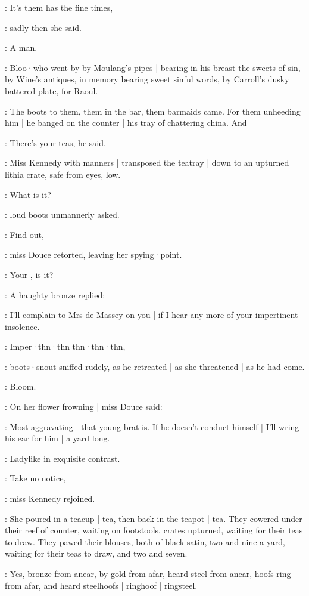 \MissK:
It's them has the fine times,

:
sadly then she said.

:
A man.

:
Bloo·who went by by Moulang's pipes |
bearing in his breast the sweets of sin,
by Wine's antiques,
in memory bearing sweet sinful words,
by Carroll's dusky battered plate,
for Raoul.

:
The boots to them,
them in the bar,
them barmaids came.
For them unheeding him |
he banged on the counter |
his tray of chattering china.
And

\boots:
There's your teas,
\sout{he said.}

:
Miss Kennedy with manners |
transposed the teatray |
down to an upturned lithia crate,
safe from eyes,
low.

\boots:
What is it?

:
loud boots unmannerly asked.

\MissD:
Find out,

:
miss Douce retorted,
leaving her spying·point.

\boots:
Your ,
is it?

:
A haughty bronze replied:

\MissD:
I'll complain to Mrs de Massey on you |
if I hear any more of your impertinent insolence.

\boots:
Imper·thn·thn thn·thn·thn,

:
boots·snout sniffed rudely,
as he retreated |
as she threatened |
as he had come.

:
Bloom.

:
On her flower frowning |
miss Douce said:

\MissD:
Most aggravating |
that young brat is.
If he doesn't conduct himself |
I'll wring his ear for him |
a yard long.

:
Ladylike in exquisite contrast.

\MissK:
Take no notice,

:
miss Kennedy rejoined.

:
She poured in a teacup |
tea,
then back in the teapot |
tea.
They cowered under their reef of counter,
waiting on footstools,
crates upturned,
waiting for their teas to draw.
They pawed their blouses,
both of black satin,
two and nine a yard,
waiting for their teas to draw,
and two and seven.

:
Yes,
bronze from anear,
by gold from afar,
heard steel from anear,
hoofs ring from afar,
and heard steelhoofs |
ringhoof |
ringsteel.

